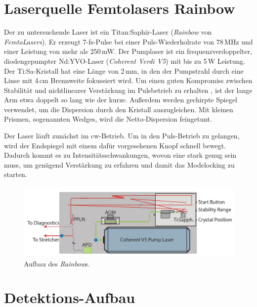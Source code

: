 \documentclass[bachelor,       %
               twoside,        %
               BCOR10mm,       %
               liststotoc,nomtotoc,bibtotoc, %
               english,ngerman, %
               final,          %
               ]{GAUBM}
\begin{document}
\section{Laserquelle Femtolasers Rainbow}
Der zu untersuchende Laser ist ein Titan:Saphir-Laser (\textit{Rainbow} von \textit{FemtoLasers}).
Er erzeugt 7-fs-Pulse bei einer Puls-Wiederholrate von $78\,$MHz und einer Leistung von mehr als $250\,$mW.
Der Pumplaser ist ein frequenzverdoppelter, diodengepumpter Nd:YVO-Laser (\textit{Coherent Verdi V5}) mit bis zu 5\,W Leistung.
Der Ti:Sa-Kristall hat eine Länge von 2\,mm, in den der Pumpstrahl durch eine Linse mit 4\,cm Brennweite fokussiert wird.
Um einen guten Kompromiss zwischen Stabilität und nichtlinearer Verstärkung im Pulsbetrieb zu erhalten \cite{stingl_sub-10-fs_1995}, ist der lange Arm etwa doppelt so lang wie der kurze.
Außerdem werden gechirpte Spiegel verwendet, um die Dispersion durch den Kristall auszugleichen.
Mit kleinen Prismen, sogenannten Wedges, wird die Netto-Dispersion feingetunt.

Der Laser läuft zunächst im cw-Betrieb.
Um in den Puls-Betrieb zu gelangen, wird der Endspiegel mit einem dafür vorgesehenen Knopf schnell bewegt.
Dadurch kommt es zu Intensitätsschwankungen, wovon eine stark genug sein muss, um genügend Verstärkung zu erfahren und damit das Modelocking zu starten.
\begin{figure}[!htb]
	\centering
	\includegraphics[width=\textwidth]{figures/rainbow2.JPG}
	\caption{Aufbau des \textit{Rainbow}s\protect\footnotemark.}
	\label{fig:rainbow}
\end{figure}
\section{Detektions-Aufbau}
\end{document}
